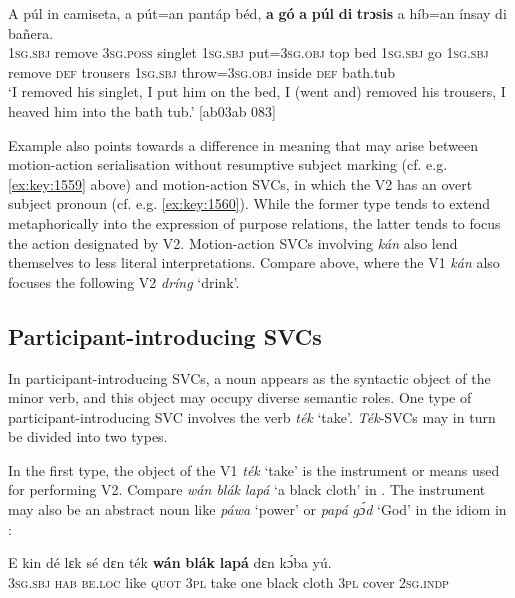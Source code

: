 \ea%
    \label{ex:key:1560}
    \gll A    púl    in    camiseta,  a    pút=an    pantáp  béd,
\textbf{a}    \textbf{gó}  \textbf{a}    \textbf{púl}    \textbf{di}  \textbf{trɔsis}  a    híb=an
ínsay  di  bañera.\\
\textsc{1sg.sbj}  remove  \textsc{3sg.poss}  singlet    \textsc{1sg.sbj}  put=\textsc{3sg.obj}  top    bed
\textsc{1sg.sbj}  go  \textsc{1sg.sbj}  remove  \textsc{def}  trousers  \textsc{1sg.sbj}  throw=\textsc{3sg.obj}
inside  \textsc{def}  bath.tub\\

\glt ‘I removed his singlet, I put him on the bed, I (went and) removed his trousers, 
I heaved him into the bath tub.’ [ab03ab 083]
\z

Example  also points towards a difference in meaning that may arise between motion-action serialisation without resumptive subject marking (cf. e.g. \ref{ex:key:1559} above) and motion-action SVCs, in which the V2 has an overt subject pronoun (cf. e.g. \ref{ex:key:1560}). While the former type tends to extend metaphorically into the expression of purpose relations, the latter tends to focus the action designated by V2. Motion-action SVCs involving \textit{kán} also lend themselves to less literal interpretations. Compare  above, where the V1 \textit{kán} also focuses the following V2 \textit{dríng} ‘drink’. 

\subsection{Participant-introducing SVCs}\label{sec:11.2.3}

In participant-introducing SVCs, a noun appears as the syntactic object of the minor verb, and this object may occupy diverse semantic roles. One type of participant-introducing SVC involves the verb \textit{ték} ‘take’. \textit{Ték}{}-SVCs may in turn be divided into two types. 


In the first type, the object of the V1 \textit{ték} ‘take’ is the instrument\index{} or means used for performing V2. Compare \textit{wán blák lapá} ‘a black cloth’ in . The instrument may also be an abstract noun like \textit{páwa} ‘power’  or \textit{papá} \textit{gɔ́d} ‘God’ in the idiom in :



\ea%
    \label{ex:key:1561}
    \gll E    kin  dé    lɛk  sé    dɛn  ték  \textbf{wán}  \textbf{blák}    \textbf{lapá}   dɛn  kɔ́ba  yú.\\
\textsc{3sg.sbj}  \textsc{hab}  \textsc{be.loc}  like  \textsc{quot}    \textsc{3pl}  take  one  black  cloth  \textsc{3pl}  cover  \textsc{2sg.indp}\\

